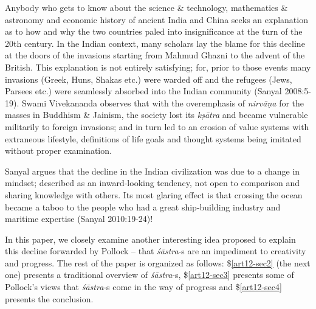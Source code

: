 \newpage

Anybody who gets to know about the science \& technology, mathematics \& astronomy and economic history of ancient India and China seeks an explanation as to how and why the two countries paled into insigniﬁcance at the turn of the 20th century. In the Indian context, many scholars lay the blame for this decline at the doors of the invasions starting from Mahmud Ghazni to the advent of the British. This explanation is not entirely satisfying; for, prior to those events many invasions (Greek, Huns, Shakas etc.) were warded off and the refugees (Jews, Parsees etc.) were seamlessly absorbed into the Indian community (Sanyal 2008:5-19). Swami Vivekananda  observes that with the overemphasis of {\sl nirvāṇa} for the masses in Buddhism \& Jainism, the society lost its {\sl kṣātra} and became vulnerable militarily to foreign invasions; and in turn led to an erosion of value systems with extraneous lifestyle, definitions of life goals and thought systems being imitated without proper examination. 

Sanyal  argues that the decline in the Indian civilization was due to a change in mindset; described as an inward-looking tendency, not open to comparison and sharing knowledge with others. Its most glaring effect is that crossing the ocean became a taboo to the people who had a great ship-building industry and maritime expertise (Sanyal 2010:19-24)!

In this paper, we closely examine another interesting idea proposed to explain this decline forwarded by Pollock -- that {\sl śāstra}-s are an impediment to creativity and progress. The rest of the paper is organized as follows: \$\ref{art12-sec2} (the next one) presents a traditional overview of {\sl śāstra}-s,  \$\ref{art12-sec3} presents some of Pollock's views that {\sl śāstra}-s come in the way of progress and \$\ref{art12-sec4} presents the conclusion.

